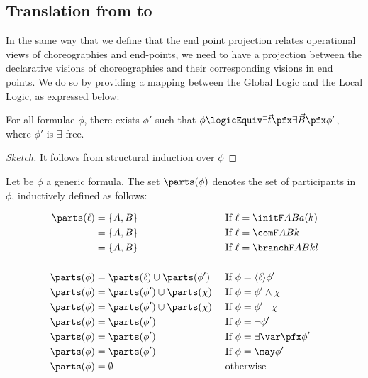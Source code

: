 \subsection{Translation from \texorpdfstring{\GL}{GL}  to
  \texorpdfstring{\LL}{LL} }


In the same way that we define that the end point projection relates
operational views of choreographies and end-points, we need to have a
projection between the declarative visions of choreographies and their
corresponding visions in end points. We do so by providing a mapping
between the Global Logic and the Local Logic, as expressed below:


\begin{proposition}\label{Logic4Struct:prop:nf}
  For all \GL formulae $\phi$, there exists $\phi'$ such that $\phi
  \logicEquiv \exists \vec{t}\pfx \exists
  \vec{B}\pfx \phi'$, where $\phi'$ is $\exists$ free.
%
\end{proposition}
\begin{proof}[Sketch]
  It follows from structural induction over $\phi$ 
\end{proof}

\begin{definition}
Let be $\phi$ a generic \GL
formula. The set  $\parts(\phi)$ denotes the  set of participants in
$\phi$, inductively defined as follows:

\begin{align*}
\parts(\ell) & = \{A,B\} && \text{ If } \ell = \initF A B {a(k)} \\
& = \{A,B\} && \text{ If } \ell = \comF ABk \\
& = \{A,B\} && \text{ If } \ell = \branchF ABkl \\\\
\parts(\phi)      &=  \parts(\ell) \cup \parts(\phi') & &\text{ If }\phi = \langle\ell\rangle \phi' \\
\parts(\phi)      &=  \parts(\phi') \cup \parts(\chi) &&\text{ If } \phi = \phi' \land \chi \\
\parts(\phi)      &=  \parts(\phi') \cup \parts(\chi) &&\text{ If } \phi = \phi' \mid \chi \\
\parts(\phi)      &=  \parts(\phi') &&\text{ If } \phi = \neg \phi'\\
\parts(\phi)      &=  \parts(\phi') &&\text{ If } \phi = \exists \var\pfx \phi' \\
\parts(\phi)      &=  \parts(\phi') &&\text{ If } \phi = \may \phi'  \\
\parts(\phi)      &=  \emptyset && \text{ otherwise}
\end{align*}
\end{definition}


